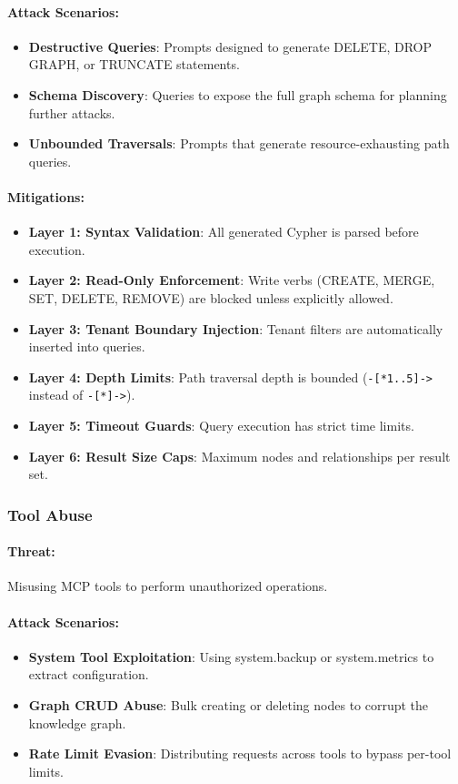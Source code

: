 \paragraph{Attack Scenarios:}
\begin{itemize}
    \item \textbf{Destructive Queries}: Prompts designed to generate DELETE, DROP GRAPH, or TRUNCATE statements.
    \item \textbf{Schema Discovery}: Queries to expose the full graph schema for planning further attacks.
    \item \textbf{Unbounded Traversals}: Prompts that generate resource-exhausting path queries.
\end{itemize}

\paragraph{Mitigations:}
\begin{itemize}
    \item \textbf{Layer 1: Syntax Validation}: All generated Cypher is parsed before execution.
    \item \textbf{Layer 2: Read-Only Enforcement}: Write verbs (CREATE, MERGE, SET, DELETE, REMOVE) are blocked unless explicitly allowed.
    \item \textbf{Layer 3: Tenant Boundary Injection}: Tenant filters are automatically inserted into queries.
    \item \textbf{Layer 4: Depth Limits}: Path traversal depth is bounded (\texttt{-[*1..5]->} instead of \texttt{-[*]->}).
    \item \textbf{Layer 5: Timeout Guards}: Query execution has strict time limits.
    \item \textbf{Layer 6: Result Size Caps}: Maximum nodes and relationships per result set.
\end{itemize}

\subsubsection{Tool Abuse}

\paragraph{Threat:} Misusing MCP tools to perform unauthorized operations.

\paragraph{Attack Scenarios:}
\begin{itemize}
    \item \textbf{System Tool Exploitation}: Using system.backup or system.metrics to extract configuration.
    \item \textbf{Graph CRUD Abuse}: Bulk creating or deleting nodes to corrupt the knowledge graph.
    \item \textbf{Rate Limit Evasion}: Distributing requests across tools to bypass per-tool limits.
\end{itemize}

